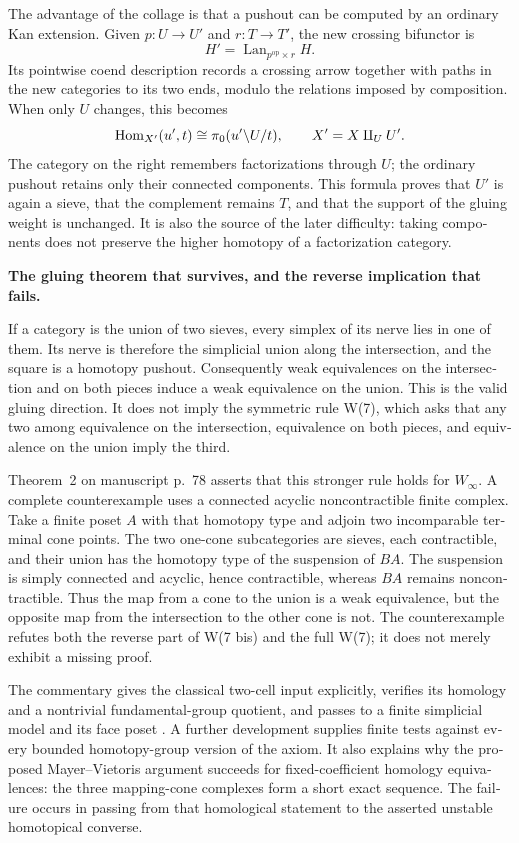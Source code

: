 \begin{otherlanguage}{english}
The advantage of the collage is that a pushout can be computed by an ordinary Kan extension. Given $p:U\to U'$ and $r:T\to T'$, the new crossing bifunctor is
\[
 H'=\operatorname{Lan}_{p^{\mathrm{op}}\times r}H.
\]
Its pointwise coend description records a crossing arrow together with paths in the new categories to its two ends, modulo the relations imposed by composition. When only $U$ changes, this becomes
\[
 \mathrm{Hom}_{X'}(u',t)\cong\pi_0(u'\backslash U/t),
 \qquad X'=X\amalg_U U'.
\]
The category on the right remembers factorizations through $U$; the ordinary pushout retains only their connected components. This formula proves that $U'$ is again a sieve, that the complement remains $T$, and that the support of the gluing weight is unchanged. It is also the source of the later difficulty: taking components does not preserve the higher homotopy of a factorization category.

\medskip
{}
\noindent\textbf{The gluing theorem that survives, and the reverse implication that fails.}

If a category is the union of two sieves, every simplex of its nerve lies in one of them. Its nerve is therefore the simplicial union along the intersection, and the square is a homotopy pushout. Consequently weak equivalences on the intersection and on both pieces induce a weak equivalence on the union. This is the valid gluing direction. It does not imply the symmetric rule W(7), which asks that any two among equivalence on the intersection, equivalence on both pieces, and equivalence on the union imply the third.

Theorem~2 on manuscript p.~78 asserts that this stronger rule holds for $W_\infty$. A complete counterexample uses a connected acyclic noncontractible finite complex. Take a finite poset $A$ with that homotopy type and adjoin two incomparable terminal cone points. The two one-cone subcategories are sieves, each contractible, and their union has the homotopy type of the suspension of $BA$. The suspension is simply connected and acyclic, hence contractible, whereas $BA$ remains noncontractible. Thus the map from a cone to the union is a weak equivalence, but the opposite map from the intersection to the other cone is not. The counterexample refutes both the reverse part of W(7 bis) and the full W(7); it does not merely exhibit a missing proof.

The commentary gives the classical two-cell input explicitly, verifies its homology and a nontrivial fundamental-group quotient, and passes to a finite simplicial model and its face poset \citep[Example~2.38 and Theorem~2C.5]{Hatcher2002}. A further development supplies finite tests against every bounded homotopy-group version of the axiom. It also explains why the proposed Mayer--Vietoris argument succeeds for fixed-coefficient homology equivalences: the three mapping-cone complexes form a short exact sequence. The failure occurs in passing from that homological statement to the asserted unstable homotopical converse.


\end{otherlanguage}
